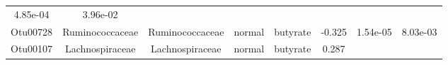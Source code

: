\documentclass[11pt,]{article}
\begin{document}
\begin{longtable}[]{@{}cccccccc@{}}
\begin{minipage}[t]{0.08\columnwidth}
4.85e-04\strut
\end{minipage} & \begin{minipage}[t]{0.08\columnwidth}\centering\strut
3.96e-02\strut
\end{minipage}\tabularnewline
\begin{minipage}[t]{0.08\columnwidth}\centering\strut
Otu00728\strut
\end{minipage} & \begin{minipage}[t]{0.15\columnwidth}\centering\strut
Ruminococcaceae\strut
\end{minipage} & \begin{minipage}[t]{0.15\columnwidth}\centering\strut
Ruminococcaceae\strut
\end{minipage} & \begin{minipage}[t]{0.08\columnwidth}\centering\strut
normal\strut
\end{minipage} & \begin{minipage}[t]{0.09\columnwidth}\centering\strut
butyrate\strut
\end{minipage} & \begin{minipage}[t]{0.07\columnwidth}\centering\strut
-0.325\strut
\end{minipage} & \begin{minipage}[t]{0.08\columnwidth}\centering\strut
1.54e-05\strut
\end{minipage} & \begin{minipage}[t]{0.08\columnwidth}\centering\strut
8.03e-03\strut
\end{minipage}\tabularnewline
\begin{minipage}[t]{0.08\columnwidth}\centering\strut
Otu00107\strut
\end{minipage} & \begin{minipage}[t]{0.15\columnwidth}\centering\strut
Lachnospiraceae\strut
\end{minipage} & \begin{minipage}[t]{0.15\columnwidth}\centering\strut
Lachnospiraceae\strut
\end{minipage} & \begin{minipage}[t]{0.08\columnwidth}\centering\strut
normal\strut
\end{minipage} & \begin{minipage}[t]{0.09\columnwidth}\centering\strut
butyrate\strut
\end{minipage} & \begin{minipage}[t]{0.07\columnwidth}\centering\strut
0.287\strut
\end{minipage} & \begin{minipage}[t]{0.08\columnwidth}\centering\strut

\end{minipage}
\end{longtable}
\end{document}
